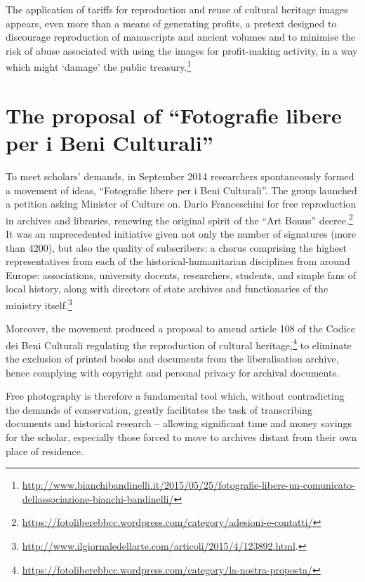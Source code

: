 \documentclass[amsthm,ebook]{saparticle}
\begin{document}
The application of tariffs for reproduction and reuse of cultural heritage images appears, even more than a means of
generating profits, a pretext designed to discourage reproduction of manuscripts and ancient volumes and to minimise
the risk of abuse associated with using the images for profit-making activity, in a way which might `damage' the public
treasury.\footnote{\url{http://www.bianchibandinelli.it/2015/05/25/fotografie-libere-un-comunicato-dellassociazione-bianchi-bandinelli/}}




\section{The proposal of ``Fotografie libere per i Beni Culturali''}




To meet scholars’ demands, in September 2014 researchers spontaneously formed a movement of ideas, ``Fotografie libere
per i Beni Culturali''. The group launched a petition asking Minister of Culture on. Dario Franceschini for free
reproduction in archives and libraries, renewing the original spirit of the ``Art Bonus''
decree.\footnote{\url{https://fotoliberebbcc.wordpress.com/category/adesioni-e-contatti/}} It was an unprecedented
initiative given not only the number of signatures (more than 4200), but also the quality of subscribers: a chorus
comprising the highest representatives from each of the historical-humanitarian disciplines from around Europe:
associations, university docents, researchers, students, and simple fans of local history, along with directors of
state archives and functionaries of the ministry
itself.\footnote{\url{http://www.ilgiornaledellarte.com/articoli/2015/4/123892.html}.}

Moreover, the movement produced a proposal to amend article 108 of the Codice dei Beni Culturali regulating the
reproduction of cultural heritage,\footnote{\url{https://fotoliberebbcc.wordpress.com/category/la-nostra-proposta/}} to eliminate the
exclusion of printed books and documents from the liberalisation archive, hence complying with copyright and personal
privacy for archival documents.

Free photography is therefore a fundamental tool which, without contradicting the demands of conservation, greatly
facilitates the task of transcribing documents and historical research – allowing significant time and money savings
for the scholar, especially those forced to move to archives distant from their own place of residence.
\end{document}
